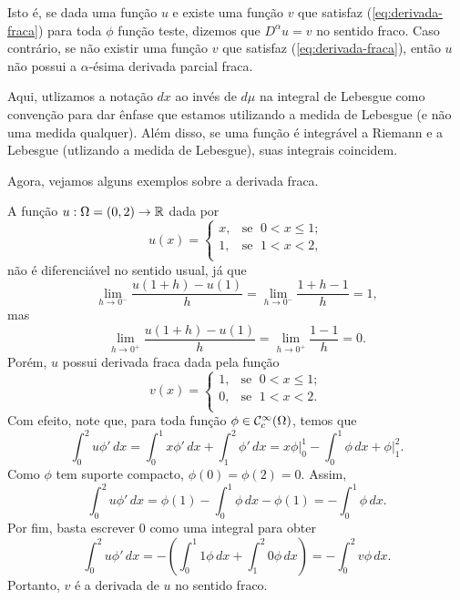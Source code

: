 Isto é, se dada uma função $u$ e existe uma função $v$ que satisfaz (\ref{eq:derivada-fraca}) para toda $\phi$ função teste, dizemos que $D^\alpha u = v$ no sentido fraco.
Caso contrário, se não existir uma função $v$ que satisfaz (\ref{eq:derivada-fraca}), então $u$ não possui a $\alpha$-ésima derivada parcial fraca.

\obs Aqui, utlizamos a notação $dx$ ao invés de $d\mu$ na integral de Lebesgue como convenção para dar ênfase que estamos utilizando a medida de Lebesgue (e não uma medida qualquer).
Além disso, se uma função é integrável a Riemann e a Lebesgue (utlizando a medida de Lebesgue), suas integrais coincidem.

Agora, vejamos alguns exemplos sobre a derivada fraca.

\begin{ex} \label{ex:derivada-fraca-R}
    A função $u : \Omega  =(0,2) \to \mathbb{R}$ dada por
    \begin{equation} \label{eq:uxexemplo1}
        u(x) = \left\{
            \begin{array}{rl}
                x, & \!\text{se }\; 0 < x \leqslant 1;\\
                1, & \!\text{se }\; 1 < x < 2,\\
            \end{array}
        \right.
    \end{equation}
    não é diferenciável no sentido usual, já que
    \[
        \lim_{h\to 0^-} \frac{u(1 + h) - u(1)}{h} = \lim_{h \to 0^-} \frac{1 + h -1}{h} = 1,
    \]
    mas
    \[
        \lim_{h\to 0^+} \frac{u(1 + h) - u(1)}{h} = \lim_{h \to 0^+} \frac{1 -1}{h} = 0.
    \]
    Porém, $u$ possui derivada fraca dada pela função
    \[
        v(x) = \left\{
            \begin{array}{rl}
                1, & \text{se }\; 0 < x \leqslant 1;\\
                0, & \text{se }\; 1 < x < 2.\\
            \end{array}
        \right.
    \]
    Com efeito, note que, para toda função $\phi \in \mathcal{C}^\infty_c(\Omega)$, temos que
    \[
        \int_0^2 u \phi' \,dx = \int_0^1 x \phi' \,dx + \int_1^2 \phi' \,dx = x \phi \bigg|_0^1 - \int_0^1 \phi \,dx + \phi \bigg|_1^2.
    \]
    Como $\phi$ tem suporte compacto, $\phi(0) = \phi(2) = 0$. Assim,
    \[
        \int_0^2 u \phi' \,dx = \phi(1) - \int_0^1 \phi \,dx - \phi(1) = -\int_0^1 \phi \,dx.
    \]
    Por fim, basta escrever $0$ como uma integral para obter
    \[
        \int_0^2 u \phi' \,dx = - \left(  \int_0^1 1\phi \, dx + \int_1^2 0\phi \,dx  \right) = -\int_0^2 v \phi \,dx.
    \]
    Portanto, $v$ é a derivada de $u$ no sentido fraco.
\end{ex}

